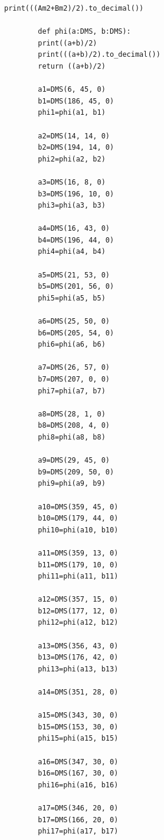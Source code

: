 \documentclass[dvipsnames, svgnames,a4paper,11pt]{article}
\begin{document}
\begin{lstlisting}[style=pythonstyle,caption=代码记录]
		print(((Am2+Bm2)/2).to_decimal())
		
		def phi(a:DMS, b:DMS):
		print((a+b)/2)
		print(((a+b)/2).to_decimal())
		return ((a+b)/2)
		
		a1=DMS(6, 45, 0)
		b1=DMS(186, 45, 0)
		phi1=phi(a1, b1)
		
		a2=DMS(14, 14, 0)
		b2=DMS(194, 14, 0)
		phi2=phi(a2, b2)
		
		a3=DMS(16, 8, 0)
		b3=DMS(196, 10, 0)
		phi3=phi(a3, b3)
		
		a4=DMS(16, 43, 0)
		b4=DMS(196, 44, 0)
		phi4=phi(a4, b4)
		
		a5=DMS(21, 53, 0)
		b5=DMS(201, 56, 0)
		phi5=phi(a5, b5)
		
		a6=DMS(25, 50, 0)
		b6=DMS(205, 54, 0)
		phi6=phi(a6, b6)
		
		a7=DMS(26, 57, 0)
		b7=DMS(207, 0, 0)
		phi7=phi(a7, b7)
		
		a8=DMS(28, 1, 0)
		b8=DMS(208, 4, 0)
		phi8=phi(a8, b8)
		
		a9=DMS(29, 45, 0)
		b9=DMS(209, 50, 0)
		phi9=phi(a9, b9)
		
		a10=DMS(359, 45, 0)
		b10=DMS(179, 44, 0)
		phi10=phi(a10, b10)
		
		a11=DMS(359, 13, 0)
		b11=DMS(179, 10, 0)
		phi11=phi(a11, b11)
		
		a12=DMS(357, 15, 0)
		b12=DMS(177, 12, 0)
		phi12=phi(a12, b12)
		
		a13=DMS(356, 43, 0)
		b13=DMS(176, 42, 0)
		phi13=phi(a13, b13)
		
		a14=DMS(351, 28, 0)
		
		a15=DMS(343, 30, 0)
		b15=DMS(153, 30, 0)
		phi15=phi(a15, b15)
		
		a16=DMS(347, 30, 0)
		b16=DMS(167, 30, 0)
		phi16=phi(a16, b16)
		
		a17=DMS(346, 20, 0)
		b17=DMS(166, 20, 0)
		phi17=phi(a17, b17)
	\end{lstlisting}
	
	
	
\end{document}
